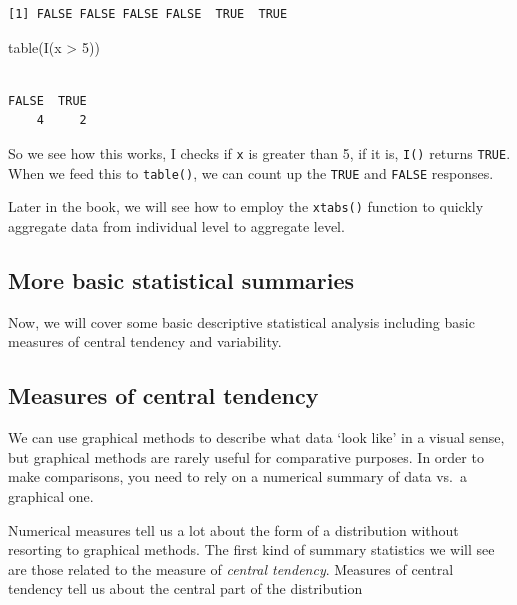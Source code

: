 \documentclass[
  letterpaper,
  DIV=11,
  numbers=noendperiod]{scrreprt}
\newenvironment{Shaded}{\begin{snugshade}}{\end{snugshade}}
\newcommand{\DecValTok}[1]{\textcolor[rgb]{0.68,0.00,0.00}{#1}}
\newcommand{\FunctionTok}[1]{\textcolor[rgb]{0.28,0.35,0.67}{#1}}
\newcommand{\NormalTok}[1]{\textcolor[rgb]{0.00,0.23,0.31}{#1}}
\newcommand{\SpecialCharTok}[1]{\textcolor[rgb]{0.37,0.37,0.37}{#1}}
\begin{document}
\begin{verbatim}
[1] FALSE FALSE FALSE FALSE  TRUE  TRUE
\end{verbatim}

\begin{Shaded}
\begin{Highlighting}[]
\FunctionTok{table}\NormalTok{(}\FunctionTok{I}\NormalTok{(x }\SpecialCharTok{\textgreater{}} \DecValTok{5}\NormalTok{))}
\end{Highlighting}
\end{Shaded}

\begin{verbatim}

FALSE  TRUE 
    4     2 
\end{verbatim}

So we see how this works, I checks if \texttt{x} is greater than 5, if
it is, \texttt{I()} returns \texttt{TRUE}. When we feed this to
\texttt{table()}, we can count up the \texttt{TRUE} and \texttt{FALSE}
responses.

Later in the book, we will see how to employ the \texttt{xtabs()}
function to quickly aggregate data from individual level to aggregate
level.

\hypertarget{more-basic-statistical-summaries}{%
\subsection{More basic statistical
summaries}\label{more-basic-statistical-summaries}}

Now, we will cover some basic descriptive statistical analysis including
basic measures of central tendency and variability.

\hypertarget{measures-of-central-tendency}{%
\subsection{Measures of central
tendency}\label{measures-of-central-tendency}}

We can use graphical methods to describe what data `look like' in a
visual sense, but graphical methods are rarely useful for comparative
purposes. In order to make comparisons, you need to rely on a numerical
summary of data vs.~a graphical one.

Numerical measures tell us a lot about the form of a distribution
without resorting to graphical methods. The first kind of summary
statistics we will see are those related to the measure of \emph{central
tendency}. Measures of central tendency tell us about the central part
of the distribution
\end{document}

